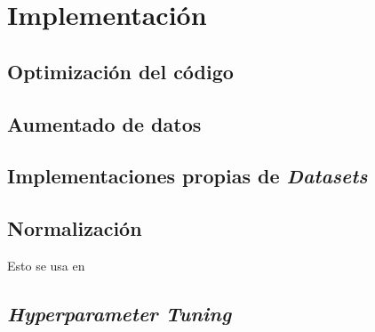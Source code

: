 \chapter{Implementación} \label{ich:implementacion}

\section{Optimización del código} \label{isec:optimizacion_codigo}

\section{Aumentado de datos} \label{isec:aumentado_datos}

\section{Implementaciones propias de \textit{Datasets}} \label{isec:datasets_customs}

\section{Normalización}

Esto se usa en \cite{informatica:facenet}

\section{\textit{Hyperparameter Tuning}}


